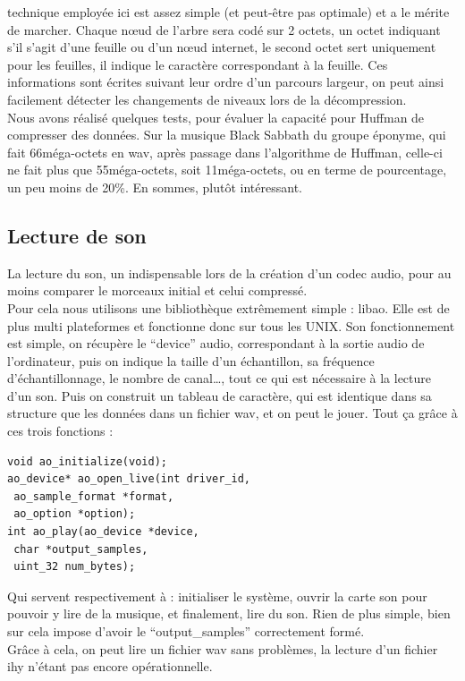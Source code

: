 \documentclass[a4paper,12pt]{article}
\begin{document}
technique employée ici est assez simple (et peut-être pas optimale) et a le
mérite de marcher. Chaque nœud de l'arbre sera codé sur 2 octets, un octet
indiquant s'il s'agit d'une feuille ou d'un nœud internet, le second octet sert
uniquement pour les feuilles, il indique le caractère correspondant à la
feuille. Ces informations sont écrites suivant leur ordre d'un parcours largeur,
on peut ainsi facilement détecter les changements de niveaux lors de la
décompression.\\
Nous avons réalisé quelques tests, pour évaluer la capacité pour Huffman de
compresser des données. Sur la musique Black Sabbath du groupe éponyme, qui fait
66méga-octets en wav, après passage dans l'algorithme de Huffman, celle-ci ne
fait plus que 55méga-octets, soit 11méga-octets, ou en terme de pourcentage, un
peu moins de 20\%. En sommes, plutôt intéressant.\\

	\subsection{Lecture de son}
La lecture du son, un indispensable lors de la création d'un codec audio, pour
au moins comparer le morceaux initial et celui compressé.\\ Pour cela nous
utilisons une bibliothèque extrêmement simple : libao.  Elle est de plus multi
plateformes et fonctionne donc sur tous les UNIX.  Son fonctionnement est
simple, on récupère le ``device'' audio, correspondant à la sortie audio de
l'ordinateur, puis on indique la taille d'un échantillon, sa fréquence
d'échantillonnage, le nombre de canal\ldots, tout ce qui est nécessaire à la
lecture d'un son. Puis on construit un tableau de caractère, qui est identique
dans sa structure que les données dans un fichier wav, et on peut le jouer. Tout
ça grâce à ces trois fonctions :
\newpage
\begin{verbatim}
void ao_initialize(void);
ao_device* ao_open_live(int driver_id,
 ao_sample_format *format,
 ao_option *option);
int ao_play(ao_device *device,
 char *output_samples,
 uint_32 num_bytes);
\end{verbatim}
Qui servent respectivement à : initialiser le système, ouvrir la carte son pour
pouvoir y lire de la musique, et finalement, lire du son. Rien de plus simple,
bien sur cela impose d'avoir le ``output\_samples'' correctement formé.\\
Grâce à cela, on peut lire un fichier wav sans problèmes, la lecture d'un
fichier ihy n'étant pas encore opérationnelle.\\
\end{document}
